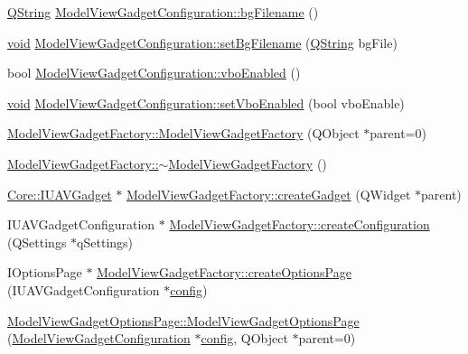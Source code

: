\begin{DoxyCompactItemize}
\item 
\hyperlink{group___u_a_v_objects_plugin_gab9d252f49c333c94a72f97ce3105a32d}{Q\-String} \hyperlink{group___model_view_plugin_ga1d269e09831fb3fd6187c831b3b516b1}{Model\-View\-Gadget\-Configuration\-::bg\-Filename} ()
\item 
\hyperlink{group___u_a_v_objects_plugin_ga444cf2ff3f0ecbe028adce838d373f5c}{void} \hyperlink{group___model_view_plugin_gac9bccdbb077005f2bb94cfc7c9dfefaa}{Model\-View\-Gadget\-Configuration\-::set\-Bg\-Filename} (\hyperlink{group___u_a_v_objects_plugin_gab9d252f49c333c94a72f97ce3105a32d}{Q\-String} bg\-File)
\item 
bool \hyperlink{group___model_view_plugin_ga82f3e4d2137def4ff8aa56abc69d3bce}{Model\-View\-Gadget\-Configuration\-::vbo\-Enabled} ()
\item 
\hyperlink{group___u_a_v_objects_plugin_ga444cf2ff3f0ecbe028adce838d373f5c}{void} \hyperlink{group___model_view_plugin_gad35eb4d4a2a27f015e4e54b18e3b2b97}{Model\-View\-Gadget\-Configuration\-::set\-Vbo\-Enabled} (bool vbo\-Enable)
\item 
\hyperlink{group___model_view_plugin_gab4ca362258332f3214c66cc63ba54d77}{Model\-View\-Gadget\-Factory\-::\-Model\-View\-Gadget\-Factory} (Q\-Object $\ast$parent=0)
\item 
\hyperlink{group___model_view_plugin_ga7bdf383eb25b1a5226f036371be723b5}{Model\-View\-Gadget\-Factory\-::$\sim$\-Model\-View\-Gadget\-Factory} ()
\item 
\hyperlink{class_core_1_1_i_u_a_v_gadget}{Core\-::\-I\-U\-A\-V\-Gadget} $\ast$ \hyperlink{group___model_view_plugin_ga10c8c524e828527192c4821b769ab1fe}{Model\-View\-Gadget\-Factory\-::create\-Gadget} (Q\-Widget $\ast$parent)
\item 
I\-U\-A\-V\-Gadget\-Configuration $\ast$ \hyperlink{group___model_view_plugin_gaa2d13e8c20201017fc03b9ffd781247c}{Model\-View\-Gadget\-Factory\-::create\-Configuration} (Q\-Settings $\ast$q\-Settings)
\item 
I\-Options\-Page $\ast$ \hyperlink{group___model_view_plugin_gacccb2300c14739970fbef9a38365c070}{Model\-View\-Gadget\-Factory\-::create\-Options\-Page} (I\-U\-A\-V\-Gadget\-Configuration $\ast$\hyperlink{deflate_8c_a4473b5227787415097004fd39f55185e}{config})
\item 
\hyperlink{group___model_view_plugin_ga86839ae520e5a8d7d38e0349ab8110db}{Model\-View\-Gadget\-Options\-Page\-::\-Model\-View\-Gadget\-Options\-Page} (\hyperlink{class_model_view_gadget_configuration}{Model\-View\-Gadget\-Configuration} $\ast$\hyperlink{deflate_8c_a4473b5227787415097004fd39f55185e}{config}, Q\-Object $\ast$parent=0)

\end{DoxyCompactItemize}
